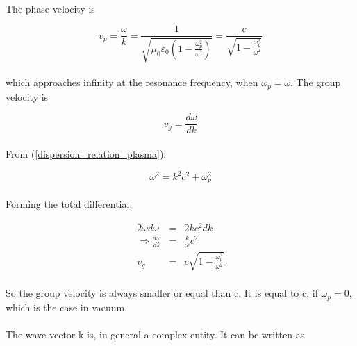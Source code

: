 \documentclass[a4paper,10pt]{thesis}
\begin{document}
\paragraph*{}
The phase velocity is

\begin{equation}\label{phasespeed_plasma}
    v_p=\frac{\omega}{k}=\frac{1}{\sqrt{\mu_0\varepsilon_0 \left(1-\frac{\omega_p^2 }{ \omega^2 }\right)}}= \frac{c}{ \sqrt{1-\frac{\omega_p^2 }{ \omega^2 }}}
\end{equation}

\paragraph*{}
which approaches infinity at the resonance frequency, when $\omega_p = \omega$. The group velocity is

\begin{equation}\label{groupspeed_plasma}
    v_g=\frac{d\omega}{dk}
\end{equation}

\paragraph*{}
From (\ref{dispersion_relation_plasma}):

\begin{equation}
    \omega^2=k^2c^2+\omega_p^2
\end{equation}

\paragraph*{}
Forming the total differential:

\begin{eqnarray}
    2\omega d\omega&=&2kc^2dk\\
    \Rightarrow \frac{d\omega}{dk}&=&\frac{k}{\omega}c^2\nonumber \\
    v_g&=&c\sqrt{1-\frac{\omega_p^2}{\omega^2}}
\end{eqnarray}

\paragraph*{}
So the group velocity is always smaller or equal than c. It is equal to c, if $\omega_p=0$, which is the case in vacuum.

\paragraph*{}
The wave vector k is, in general a complex entity. It can be written as
\end{document}
